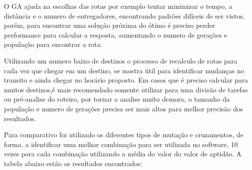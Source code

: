 O GA ajuda na escolhas das rotas por exemplo tentar minimizar o tempo, a distância e o numero de entregadores, encontrando padrões difíceis de ser vistos, porém, para encontrar uma solução próxima do ótimo é preciso perder performance para calcular a resposta, aumentando o numero de gerações e população para encontrar a rota.

Utilizando um numero baixo de destinos o processo de recalculo de rotas para cada vez que chegar em um  destino, se mostra útil para identificar mudanças no transito e ainda chegar no horário proposto. Em casos que é preciso calcular para muitos destinos,é mais recomendado somente utilizar para uma divisão de tarefas ou pré-analise do roteiro, por tornar a analise muito demora, o tamanho da população e numero de gerações precisa ser mais altos para melhor precisão dos resultados.

Para comparativo foi utilizado os diferentes tipos de mutação e cruzamentos, de forma, a identificar uma melhor combinação para ser utilizada no software, 10 vezes para cada combinação utilizando a média do valor do valor de aptidão. A tabela abaixo estão os resultados encontrados:

